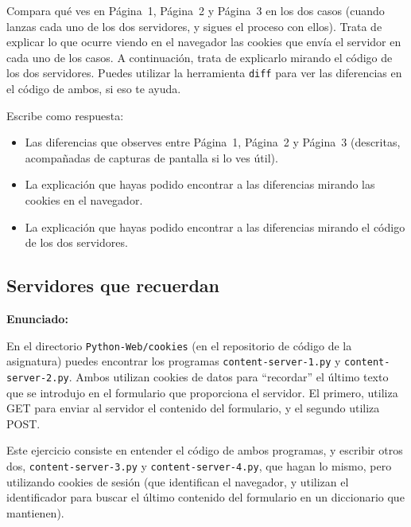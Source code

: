 Compara qué ves en Página~1, Página~2 y Página~3 en los dos casos (cuando lanzas cada uno de los dos servidores, y sigues el proceso con ellos). Trata de explicar lo que ocurre viendo en el navegador las cookies que envía el servidor en cada uno de los casos. A continuación, trata de explicarlo mirando el código de los dos servidores. Puedes utilizar la herramienta \verb|diff| para ver las diferencias en el código de ambos, si eso te ayuda.

Escribe como respuesta:

\begin{itemize}
\item Las diferencias que observes entre Página~1, Página~2 y Página~3 (descritas, acompañadas de capturas de pantalla si lo ves útil).
\item La explicación que hayas podido encontrar a las diferencias mirando las cookies en el navegador.
\item La explicación que hayas podido encontrar a las diferencias mirando el código de los dos servidores.  
\end{itemize}

\subsection{Servidores que recuerdan}
\label{subsec:servidores-recuerdan}

\textbf{Enunciado:}

En el directorio \verb|Python-Web/cookies| (en el repositorio de código de la asignatura) puedes encontrar los programas \verb|content-server-1.py| y \verb|content-server-2.py|. Ambos utilizan cookies de datos para ``recordar'' el último texto que se introdujo en el formulario que proporciona el servidor. El primero, utiliza GET para enviar al servidor el contenido del formulario, y el segundo utiliza POST.

Este ejercicio consiste en entender el código de ambos programas, y escribir otros dos, \verb|content-server-3.py| y \verb|content-server-4.py|, que hagan lo mismo, pero utilizando cookies de sesión (que identifican el navegador, y utilizan el identificador para buscar el último contenido del formulario en un diccionario que mantienen).

